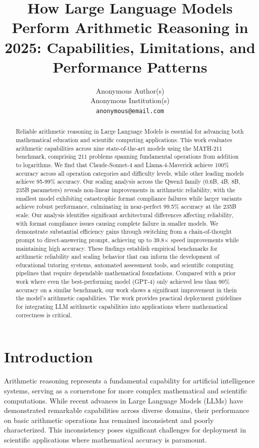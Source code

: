 \documentclass{article}
\title{How Large Language Models Perform Arithmetic Reasoning in 2025: Capabilities, Limitations, and Performance Patterns}
\author{%
  Anonymous Author(s)\\
  Anonymous Institution(s)\\
  \texttt{anonymous@email.com} \\
}
\begin{document}
\maketitle

\begin{abstract}
Reliable arithmetic reasoning in Large Language Models is essential for advancing both mathematical education and scientific computing applications. This work evaluates arithmetic capabilities across nine state-of-the-art models using the MATH-211 benchmark, comprising 211 problems spanning fundamental operations from addition to logarithms. We find that Claude-Sonnet-4 and Llama-4-Maverick achieve 100\% accuracy across all operation categories and difficulty levels, while other leading models achieve 95-99\% accuracy. Our scaling analysis across the Qwen3 family (0.6B, 4B, 8B, 235B parameters) reveals non-linear improvements in arithmetic reliability, with the smallest model exhibiting catastrophic format compliance failures while larger variants achieve robust performance, culminating in near-perfect 99.5\% accuracy at the 235B scale. Our analysis identifies significant architectural differences affecting reliability, with format compliance issues causing complete failure in smaller models. We demonstrate substantial efficiency gains through switching from a chain-of-thought prompt to direct-answering prompt, achieving up to 39.8$\times$ speed improvements while maintaining high accuracy. These findings establish empirical benchmarks for arithmetic reliability and scaling behavior that can inform the development of educational tutoring systems, automated assessment tools, and scientific computing pipelines that require dependable mathematical foundations. Compared with a prior work\citep{yuan2023arithmetic} where even the best-performing model (GPT-4) only achieved less than 90\% accuracy on a similar benchmark, our work shows a significant improvement in thein the model's arithmetic capabilities. The work provides practical deployment guidelines for integrating LLM arithmetic capabilities into applications where mathematical correctness is critical.
\end{abstract}

\section{Introduction}

Arithmetic reasoning represents a fundamental capability for artificial intelligence systems, serving as a cornerstone for more complex mathematical and scientific computations. While recent advances in Large Language Models (LLMs) have demonstrated remarkable capabilities across diverse domains, their performance on basic arithmetic operations has remained inconsistent and poorly characterized. This inconsistency poses significant challenges for deployment in scientific applications where mathematical accuracy is paramount.
\end{document}

